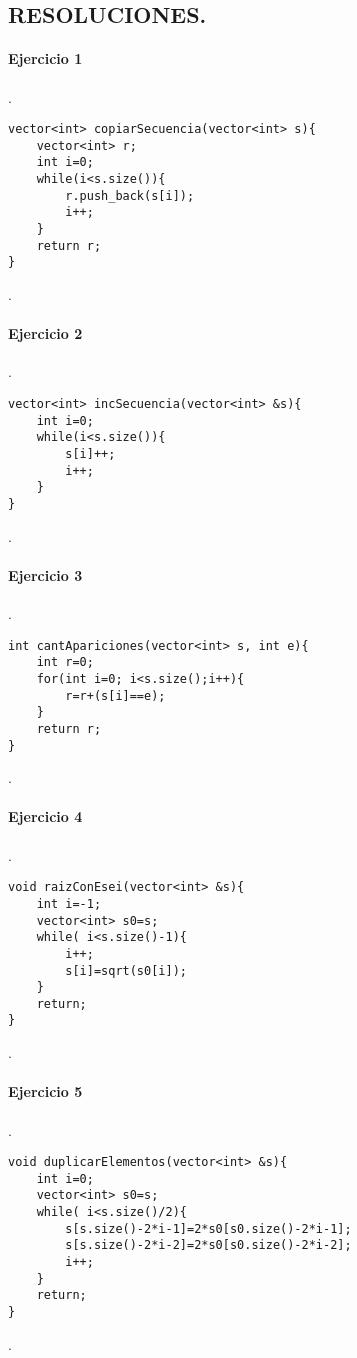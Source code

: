 \documentclass{article}
\begin{document}
\renewcommand{\thelstlisting}{\thesection.\arabic{lstlisting}}



\begin{center}
\section*{RESOLUCIONES.}
\end{center}
\paragraph{Ejercicio 1}.

\begin{lstlisting}
vector<int> copiarSecuencia(vector<int> s){
	vector<int> r;
	int i=0;
	while(i<s.size()){
		r.push_back(s[i]);
		i++;	
	}
	return r;
}
\end{lstlisting}
.
\paragraph*{Ejercicio 2}.

\begin{lstlisting}
vector<int> incSecuencia(vector<int> &s){
	int i=0;
	while(i<s.size()){
		s[i]++;
		i++;	
	}
}
\end{lstlisting}
.
\paragraph*{Ejercicio 3}.

\begin{lstlisting}
int cantApariciones(vector<int> s, int e){
	int r=0;
	for(int i=0; i<s.size();i++){
		r=r+(s[i]==e);
	}
	return r;
}
\end{lstlisting}
.
\paragraph*{Ejercicio 4}.

\begin{lstlisting}
void raizConEsei(vector<int> &s){
	int i=-1;
	vector<int> s0=s;
	while( i<s.size()-1){
		i++;
		s[i]=sqrt(s0[i]);
	}
	return;
}
\end{lstlisting}
.
\paragraph*{Ejercicio 5}.

\begin{lstlisting}
void duplicarElementos(vector<int> &s){
	int i=0;
	vector<int> s0=s;
	while( i<s.size()/2){
		s[s.size()-2*i-1]=2*s0[s0.size()-2*i-1];
		s[s.size()-2*i-2]=2*s0[s0.size()-2*i-2];
		i++;
	}
	return;
}
\end{lstlisting}
.
\end{document}
